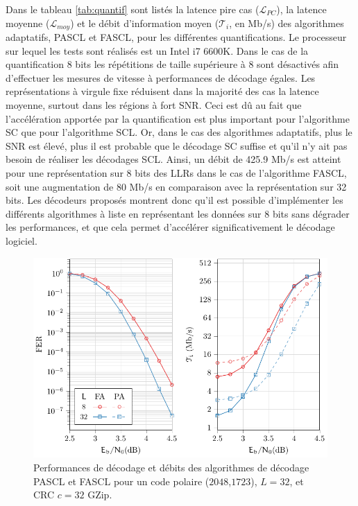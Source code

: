 Dans le tableau \ref{tab:quantif} sont listés la latence \og pire cas \fg ($\mathcal{L}_{PC}$), la latence moyenne ($\mathcal{L}_{moy}$) et le débit d'information moyen ($\mathcal{T}_i$, en Mb/s) des algorithmes adaptatifs, PASCL et FASCL, pour les différentes quantifications. Le processeur sur lequel les tests sont réalisés est un Intel i7 6600K. Dans le cas de la quantification 8 bits les \noeuds répétitions de taille supérieure à 8 sont désactivés afin d'effectuer les mesures de vitesse à performances de décodage égales. Les représentations à virgule fixe réduisent dans la majorité des cas la latence moyenne, surtout dans les régions à fort SNR. Ceci est dû au fait que l'accélération apportée par la quantification est plus important pour l'algorithme SC que pour l'algorithme SCL. Or, dans le cas des algorithmes adaptatifs, plus le SNR est élevé, plus il est probable que le décodage SC suffise et qu'il n'y ait pas besoin de réaliser les décodages SCL. Ainsi, un débit de 425.9 Mb/s est atteint pour une représentation sur 8 bits des LLRs dans le cas de l'algorithme FASCL, soit une augmentation de 80 Mb/s en comparaison avec la représentation sur 32 bits. Les décodeurs proposés montrent donc qu'il est possible d'implémenter les différents algorithmes à liste en représentant les données sur 8 bits sans dégrader les performances, et que cela permet d'accélérer significativement le décodage logiciel.

\begin{figure}[t]
\includegraphics{main/ch2_fig/curves/ascl/tikz/ascl}
\caption{Performances de décodage et débits des algorithmes de décodage PASCL et FASCL pour un code polaire ($2048$,$1723$), $L=32$, et CRC $c=32$ GZip.}
\label{fig:ascl_perfs}
\end{figure}


